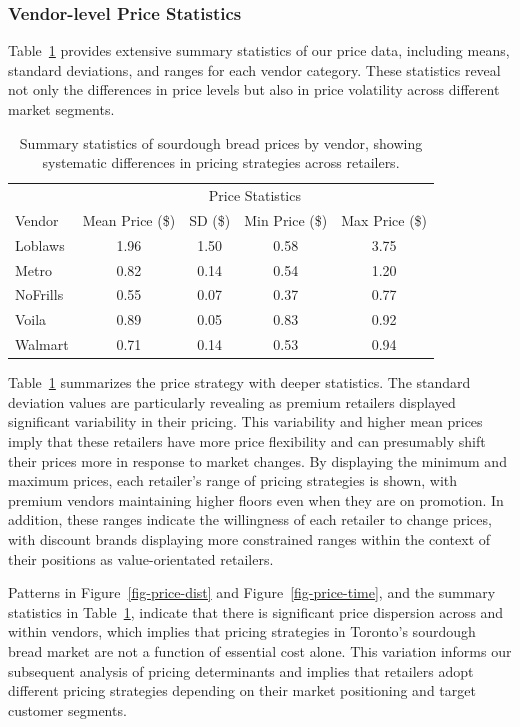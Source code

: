 \documentclass[
  letterpaper,
  DIV=11,
  numbers=noendperiod]{scrartcl}
\begin{document}
\subsubsection{Vendor-level Price
Statistics}\label{vendor-level-price-statistics}

Table~\ref{tbl-price-summary} provides extensive summary statistics of
our price data, including means, standard deviations, and ranges for
each vendor category. These statistics reveal not only the differences
in price levels but also in price volatility across different market
segments.

\begin{longtable}[t]{lcccc}

\caption{\label{tbl-price-summary}Summary statistics of sourdough bread
prices by vendor, showing systematic differences in pricing strategies
across retailers.}

\tabularnewline

\toprule
\multicolumn{1}{c}{ } & \multicolumn{4}{c}{Price Statistics} \\
\cmidrule(l{3pt}r{3pt}){2-5}
Vendor & Mean Price (\$) & SD (\$) & Min Price (\$) & Max Price (\$)\\
\midrule
Loblaws & 1.96 & 1.50 & 0.58 & 3.75\\
Metro & 0.82 & 0.14 & 0.54 & 1.20\\
NoFrills & 0.55 & 0.07 & 0.37 & 0.77\\
Voila & 0.89 & 0.05 & 0.83 & 0.92\\
Walmart & 0.71 & 0.14 & 0.53 & 0.94\\
\bottomrule

\end{longtable}

Table~\ref{tbl-price-summary} summarizes the price strategy with deeper
statistics. The standard deviation values are particularly revealing as
premium retailers displayed significant variability in their pricing.
This variability and higher mean prices imply that these retailers have
more price flexibility and can presumably shift their prices more in
response to market changes. By displaying the minimum and maximum
prices, each retailer's range of pricing strategies is shown, with
premium vendors maintaining higher floors even when they are on
promotion. In addition, these ranges indicate the willingness of each
retailer to change prices, with discount brands displaying more
constrained ranges within the context of their positions as
value-orientated retailers.

Patterns in Figure~\ref{fig-price-dist} and Figure~\ref{fig-price-time},
and the summary statistics in Table~\ref{tbl-price-summary}, indicate
that there is significant price dispersion across and within vendors,
which implies that pricing strategies in Toronto's sourdough bread
market are not a function of essential cost alone. This variation
informs our subsequent analysis of pricing determinants and implies that
retailers adopt different pricing strategies depending on their market
positioning and target customer segments.
\end{document}
